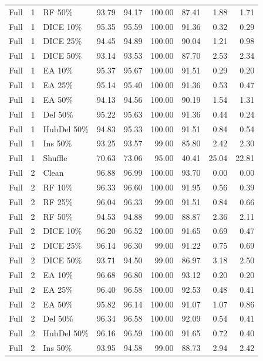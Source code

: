 {\begin{longtable}{rllrrrrrr}
Full & 1 & RF 50\% & 93.79 & 94.17 & 100.00 & 87.41 & 1.88 & 1.71 \\
Full & 1 & DICE 10\% & 95.35 & 95.59 & 100.00 & 91.36 & 0.32 & 0.29 \\
Full & 1 & DICE 25\% & 94.45 & 94.89 & 100.00 & 90.04 & 1.21 & 0.98 \\
Full & 1 & DICE 50\% & 93.14 & 93.53 & 100.00 & 87.70 & 2.53 & 2.34 \\
Full & 1 & EA 10\% & 95.37 & 95.67 & 100.00 & 91.51 & 0.29 & 0.20 \\
Full & 1 & EA 25\% & 95.14 & 95.40 & 100.00 & 91.36 & 0.53 & 0.47 \\
Full & 1 & EA 50\% & 94.13 & 94.56 & 100.00 & 90.19 & 1.54 & 1.31 \\
Full & 1 & Del 50\% & 95.22 & 95.63 & 100.00 & 91.36 & 0.44 & 0.24 \\
Full & 1 & HubDel 50\% & 94.83 & 95.33 & 100.00 & 91.51 & 0.84 & 0.54 \\
Full & 1 & Ins 50\% & 93.25 & 93.57 & 99.00 & 85.80 & 2.42 & 2.30 \\
Full & 1 & Shuffle & 70.63 & 73.06 & 95.00 & 40.41 & 25.04 & 22.81 \\
Full & 2 & Clean & 96.88 & 96.99 & 100.00 & 93.70 & 0.00 & 0.00 \\
Full & 2 & RF 10\% & 96.33 & 96.60 & 100.00 & 91.95 & 0.56 & 0.39 \\
Full & 2 & RF 25\% & 96.04 & 96.33 & 99.00 & 91.51 & 0.84 & 0.66 \\
Full & 2 & RF 50\% & 94.53 & 94.88 & 99.00 & 88.87 & 2.36 & 2.11 \\
Full & 2 & DICE 10\% & 96.20 & 96.52 & 100.00 & 91.65 & 0.69 & 0.47 \\
Full & 2 & DICE 25\% & 96.14 & 96.30 & 99.00 & 91.22 & 0.75 & 0.69 \\
Full & 2 & DICE 50\% & 93.71 & 94.50 & 99.00 & 86.97 & 3.18 & 2.50 \\
Full & 2 & EA 10\% & 96.68 & 96.80 & 100.00 & 93.12 & 0.20 & 0.20 \\
Full & 2 & EA 25\% & 96.40 & 96.58 & 100.00 & 92.53 & 0.48 & 0.41 \\
Full & 2 & EA 50\% & 95.82 & 96.14 & 100.00 & 91.07 & 1.07 & 0.86 \\
Full & 2 & Del 50\% & 96.34 & 96.58 & 100.00 & 92.09 & 0.54 & 0.41 \\
Full & 2 & HubDel 50\% & 96.16 & 96.59 & 100.00 & 91.65 & 0.72 & 0.40 \\
Full & 2 & Ins 50\% & 93.95 & 94.58 & 99.00 & 88.73 & 2.94 & 2.42 \\

\end{longtable}}
